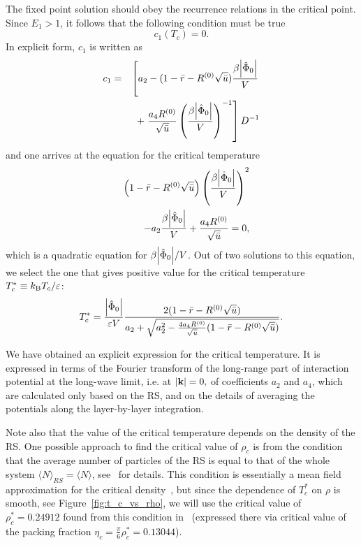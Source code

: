 The fixed point solution should obey the recurrence relations in the critical point. Since $E_1 > 1$, it follows that the following condition must be true
\begin{equation*}
	c_1(T_c) = 0.
\end{equation*}
In explicit form, $c_1$ is written as
\begin{eqnarray*}
	c_1 & = & 
	\left[
		a_2 - (1 - \bar{r} - R^{(0)}\sqrt{\bar{u}})\frac{\beta \abs{\hat{\Phi}_0}}{V} 
		\right.
		\\
		&& + \left.\frac{a_4 R^{(0)}}{\sqrt{\bar{u}}} \left(\frac{\beta \abs{\hat{\Phi}_0}}{V}\right)^{-1}
	\right] D^{-1}
\end{eqnarray*}
and one arrives at the equation for the critical temperature
\begin{eqnarray}
	&& \left(1 - \bar{r} - R^{(0)}\sqrt{\bar{u}} \right) \left(\frac{\beta \abs{\hat{\Phi}_0}}{V}\right)^{2}
	\nonumber
	\\
	& & - a_2  \frac{\beta \abs{\hat{\Phi}_0}}{V} + \frac{a_4 R^{(0)}}{\sqrt{\bar{u}}} = 0,
\end{eqnarray}
which is a quadratic equation for $\beta \abs{\hat{\Phi}_0}/{V}$. Out of two solutions to this equation, we select the one that gives positive value for the critical temperature $T^*_c\equiv k_{\rm B} T_c/\varepsilon$:
\begin{equation}
	\label{eq:T_c}
	T^*_c = \frac{\abs{\hat{\Phi}_0}}{\varepsilon V}
		\frac
		{2(1 - \bar{r} - R^{(0)}\sqrt{\bar{u}})}
		{a_2 + \sqrt{a_2^2 - \frac{4 a_4 R^{(0)}}{\sqrt{\bar{u}}} (1 - \bar{r} - R^{(0)}\sqrt{\bar{u}}) } }.
\end{equation}

We have obtained an explicit expression for the critical temperature. It is expressed in terms of the Fourier transform of the long-range part of interaction potential at the long-wave limit, i.e. at $\abs{\vb k} = 0,$ of coefficients $a_2$ and $a_4$, which are calculated only based on the RS, and on the details of averaging the potentials along the layer-by-layer integration. 

Note also that the value of the critical temperature depends on the density of the RS. One possible approach to find the critical value of $\rho_c$ is from the condition that the average number of particles of the RS is equal to that of the whole system $\langle N \rangle_{RS} = \langle N \rangle$, see~\cite{RomaJPS2024} for details. This condition is essentially a mean field approximation for the critical density~\cite{CaillolPatsahan2005,CaillolPatsahan2006}, but since the dependence of $T^*_c$ on $\rho$ is smooth, see Figure~\ref{fig:t_c_vs_rho}, we will use the critical value of $\rho_c^*=0.24912$ found from this condition in~\cite{YukhJSP1995} (expressed there via critical value of the packing fraction $\eta_c = \frac{\pi}{6}\rho^*_c = 0.13044$).

